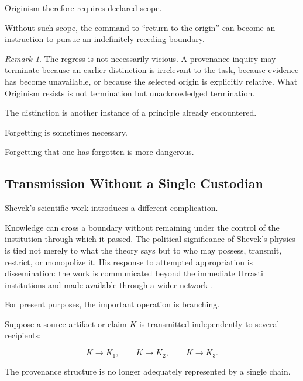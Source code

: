 \documentclass[
  11pt,
  a4paper,
  DIV=12,
  BCOR=0mm,
  parskip=half-
]{scrartcl}
\theoremstyle{definition}
\theoremstyle{plain}
\theoremstyle{remark}
\newtheorem{remark}[definition]{Remark}
\begin{document}
Originism therefore requires declared scope.

Without such scope, the command to \enquote{return to the origin} can become
an instruction to pursue an indefinitely receding boundary.

\begin{remark}
The regress is not necessarily vicious. A provenance inquiry may terminate
because an earlier distinction is irrelevant to the task, because evidence
has become unavailable, or because the selected origin is explicitly
relative. What Originism resists is not termination but unacknowledged
termination.
\end{remark}

The distinction is another instance of a principle already encountered.

Forgetting is sometimes necessary.

Forgetting that one has forgotten is more dangerous.


\subsection{Transmission Without a Single Custodian}
\label{sec:shevek-transmission}

Shevek's scientific work introduces a different complication.

Knowledge can cross a boundary without remaining under the control of the
institution through which it passed. The political significance of Shevek's
physics is tied not merely to what the theory says but to who may possess,
transmit, restrict, or monopolize it. His response to attempted appropriation
is dissemination: the work is communicated beyond the immediate Urrasti
institutions and made available through a wider network \cite{leguin1974}.

For present purposes, the important operation is branching.

Suppose a source artifact or claim \(K\) is transmitted independently to
several recipients:

\[
  K
  \longrightarrow
  K_1,
  \qquad
  K
  \longrightarrow
  K_2,
  \qquad
  K
  \longrightarrow
  K_3.
\]

The provenance structure is no longer adequately represented by a single
chain.
\end{document}
